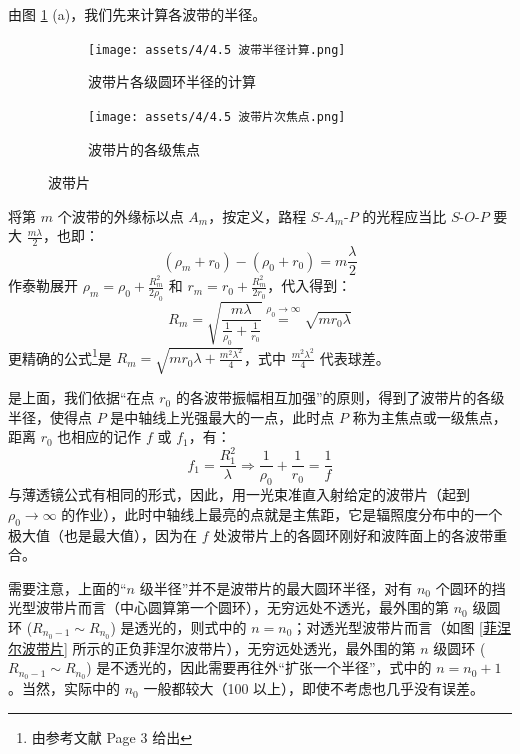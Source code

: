\documentclass[UTF8]{report}
\theoremstyle{MyLineTheoremStyle} %
\theoremstyle{MyBlockTheoremStyle} %
\theoremstyle{MySubsubsectionStyle} %
\begin{document}
由图 \ref{波带片} (a)，我们先来计算各波带的半径。
\begin{figure}[H]\centering
\begin{subfigure}[b]{0.53\columnwidth}\centering
    \texttt{[image: assets/4/4.5 波带半径计算.png]}
    \caption{波带片各级圆环半径的计算}
\end{subfigure}\hfill
\begin{subfigure}[b]{0.46\columnwidth}\centering
    \texttt{[image: assets/4/4.5 波带片次焦点.png]}
    \caption{波带片的各级焦点}
\end{subfigure}
\caption{波带片}
\label{波带片}
\end{figure}
将第 $m$ 个波带的外缘标以点 $A_m$，按定义，路程 $S$-$A_m$-$P$ 的光程应当比 $S$-$O$-$P$ 要大 $\frac{m\lambda}{2}$，也即：
\begin{equation}
(\rho_m + r_0) - (\rho_0 + r_0) = m \frac{\lambda}{2}
\end{equation}
作泰勒展开 $\rho_m = \rho_0 + \frac{R_m^2}{2\rho_0}$ 和 $r_m = r_0 + \frac{R_m^2}{2r_0}$，代入得到：
\begin{equation}
R_m = \sqrt{ \frac{m\lambda}{\frac{1}{\rho_0} + \frac{1}{r_0}} } \overset{\rho_0 \to \infty}{=}\sqrt{m r_0 \lambda}
\end{equation}
更精确的公式\footnote{由参考文献 \cite{波带片的设计及其衍射特性研究} Page 3 给出}是 $R_m = \sqrt{mr_0\lambda + \frac{m^2\lambda^2}{4}}$，式中 $\frac{m^2\lambda^2}{4}$ 代表球差。

是上面，我们依据“在点 $r_0$ 的各波带振幅相互加强”的原则，得到了波带片的各级半径，使得点 $P$ 是中轴线上光强最大的一点，此时点 $P$ 称为主焦点或一级焦点，距离 $r_0$ 也相应的记作 $f$ 或 $f_1$，有：
\begin{equation}
f_1 = \frac{R_1^2}{\lambda} \Longrightarrow  \frac{1}{\rho_0} + \frac{1}{r_0} = \frac{1}{f}
\end{equation}
与薄透镜公式有相同的形式，因此，用一光束准直入射给定的波带片（起到 $\rho_0 \to \infty$ 的作业），此时中轴线上最亮的点就是主焦距，它是辐照度分布中的一个极大值（也是最大值），因为在 $f$ 处波带片上的各圆环刚好和波阵面上的各波带重合。

需要注意，上面的“$n$ 级半径”并不是波带片的最大圆环半径，对有 $n_0$ 个圆环的挡光型波带片而言（中心圆算第一个圆环），无穷远处不透光，最外围的第 $n_0$ 级圆环 ($R_{n_0-1} \sim R_{n_0}$) 是透光的，则式中的 $n = n_0$；对透光型波带片而言（如图 \ref{菲涅尔波带片} 所示的正负菲涅尔波带片），无穷远处透光，最外围的第 $n$ 级圆环 ($R_{n_0-1} \sim R_{n_0}$) 是不透光的，因此需要再往外“扩张一个半径”，式中的 $n = n_0 + 1$。当然，实际中的 $n_0$ 一般都较大（100 以上），即使不考虑也几乎没有误差。
\end{document}

